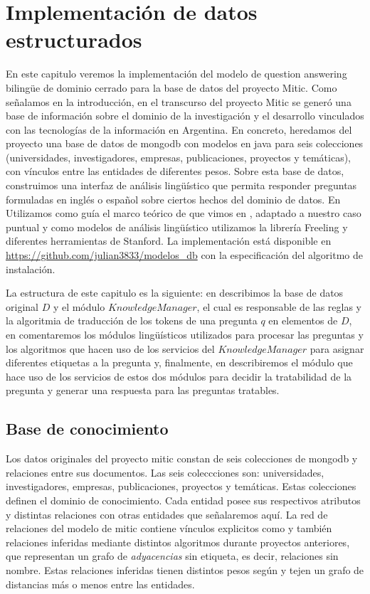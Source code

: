 \chapter{Implementación de datos estructurados}
\horrible
En este capitulo veremos la implementación del modelo de question answering bilingüe de dominio cerrado para la base de datos del proyecto Mitic. Como señalamos en la introducción, en el transcurso del proyecto Mitic se generó una base de información sobre el dominio de la investigación y el desarrollo vinculados con las tecnologías de la información en Argentina. En concreto, heredamos del proyecto una base de datos de mongodb con modelos en java para seis colecciones (universidades, investigadores, empresas, publicaciones, proyectos y temáticas), con vínculos entre las entidades de diferentes pesos. Sobre esta base de datos, construimos una interfaz de análisis lingüístico que permita responder preguntas formuladas en inglés o español sobre ciertos hechos del dominio de datos. En Utilizamos como guía el marco teórico de \cite{QADB1} que vimos en , adaptado a nuestro caso puntual y como modelos de análisis lingüístico utilizamos la librería Freeling y diferentes herramientas de Stanford. La implementación está disponible en \url{https://github.com/julian3833/modelos_db} con la especificación del algoritmo de instalación. 

La estructura de este capitulo es la siguiente: en  describimos la base de datos original $D$ y el módulo $KnowledgeManager$, el cual es responsable de las reglas y la algoritmia de traducción de los tokens de una pregunta $q$ en elementos de $D$, en  comentaremos los módulos lingüísticos utilizados para procesar las preguntas y los algoritmos que hacen uso de los servicios del $KnowledgeManager$ para asignar diferentes etiquetas a la pregunta y, finalmente, en  describiremos el módulo que hace uso de los servicios de estos dos módulos para decidir la tratabilidad de la pregunta y generar una respuesta para las preguntas tratables.

\section{Base de conocimiento}
\label{sec:grafo-mitic}

Los datos originales del proyecto mitic constan de seis colecciones de mongodb y relaciones entre sus documentos. Las seis coleccciones son: universidades, investigadores, empresas, publicaciones, proyectos y temáticas. Estas colecciones definen el dominio de conocimiento. Cada entidad posee sus respectivos atributos y distintas relaciones con otras entidades que señalaremos aquí. La red de relaciones del modelo de mitic contiene vínculos explicitos como  y también relaciones inferidas mediante distintos algoritmos durante proyectos anteriores, que representan un grafo de \textit{adyacencias} sin etiqueta, es decir, relaciones sin nombre. Estas relaciones inferidas tienen distintos pesos según y tejen un grafo de distancias más o menos  entre las entidades. 


